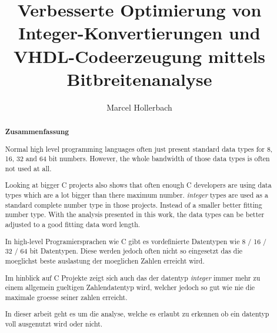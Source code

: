 \documentclass[parskip=full,12pt,a4paper,twoside,headings=openright]{scrreprt}
\title{Verbesserte Optimierung von Integer-Konvertierungen und VHDL-Codeerzeugung mittels Bitbreitenanalyse}
\author{Marcel Hollerbach}
\begin{document}
\begin{otherlanguage}{ngerman} %
\mytitlepage
\end{otherlanguage}

\begin{abstract}
\begin{center}\Huge\textbf{\textsf{Zusammenfassung}}
\end{center}
\vfill

Normal high level programming languages often just present standard data types for 8, 16, 32 and 64 bit numbers. However, the whole bandwidth of those data types is often not used at all. 

Looking at bigger C projects also shows that often enough C developers are using data types which are a lot bigger than there maximum number. \textit{integer} types are used as a standard complete number type in those projects. Instead of a smaller better fitting number type.
With the analysis presented in this work, the data types can be better adjusted to a good fitting data word length.
\vfill

In high-level Programiersprachen wie C gibt es vordefinierte Datentypen wie 8 / 16 / 32 / 64 bit Datentypen. Diese werden jedoch often nicht so eingesetzt das die moeglichst beste auslastung der moeglichen Zahlen erreicht wird.

Im hinblick auf C Projekte zeigt sich auch das der datentyp \textit{integer} immer mehr zu einem allgemein gueltigen Zahlendatentyp wird, welcher jedoch so gut wie nie die maximale groesse seiner zahlen erreicht.

In dieser arbeit geht es um die analyse, welche es erlaubt zu erkennen ob ein datentyp voll ausgenutzt wird oder nicht.

\end{abstract}

\tableofcontents









\end{document}
